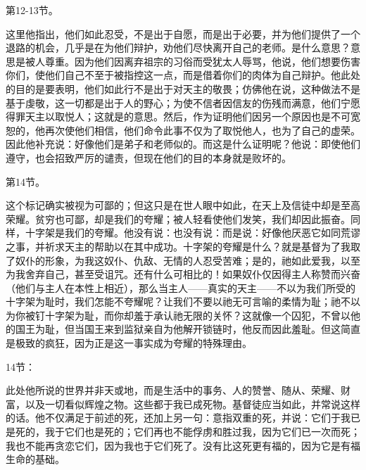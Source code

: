 第12-13节。\par

这里他指出，他们如此忍受，不是出于自愿，而是出于必要，并为他们提供了一个退路的机会，几乎是在为他们辩护，劝他们尽快离开自己的老师。是什么意思？意思是被人尊重。因为他们因离弃祖宗的习俗而受犹太人辱骂，他说，他们想要伤害你们，使他们自己不至于被指控这一点，而是借着你们的肉体为自己辩护。他此处的目的是要表明，他们如此行不是出于对天主的敬畏；仿佛他在说，这种做法不是基于虔敬，这一切都是出于人的野心；为使不信者因信友的伤残而满意，他们宁愿得罪天主以取悦人；这就是的意思。然后，作为证明他们因另一个原因也是不可宽恕的，他再次使他们相信，他们命令此事不仅为了取悦他人，也为了自己的虚荣。因此他补充说：好像他们是弟子和老师似的。而这是什么证明呢？他说：即使他们遵守，也会招致严厉的谴责，但现在他们的目的本身就是败坏的。\par

第14节。\par

这个标记确实被视为可鄙的；但这只是在世人眼中如此，在天上及信徒中却是至高荣耀。贫穷也可鄙，却是我们的夸耀；被人轻看使他们发笑，我们却因此振奋。同样，十字架是我们的夸耀。他没有说：也没有说：而是说：好像他厌恶它如同荒谬之事，并祈求天主的帮助以在其中成功。十字架的夸耀是什么？就是基督为了我取了奴仆的形象，为我这奴仆、仇敌、无情的人忍受苦难；是的，祂如此爱我，以至为我舍弃自己，甚至受诅咒。还有什么可相比的！如果奴仆仅因得主人称赞而兴奋（他们与主人在本性上相近），那么当主人——真实的天主——不以为我们所受的十字架为耻时，我们怎能不夸耀呢？让我们不要以祂无可言喻的柔情为耻；祂不以为你被钉十字架为耻，而你却羞于承认祂无限的关怀？这就像一个囚犯，不曾以他的国王为耻，但当国王来到监狱亲自为他解开锁链时，他反而因此羞耻。但这简直是极致的疯狂，因为正是这一事实成为夸耀的特殊理由。\par

14节：\par

此处他所说的世界并非天或地，而是生活中的事务、人的赞誉、随从、荣耀、财富，以及一切看似辉煌之物。这些都于我已成死物。基督徒应当如此，并常说这样的话。他不仅满足于前述的死，还加上另一句：意指双重的死，并说：它们于我已是死的，我于它们也是死的；它们再也不能俘虏和胜过我，因为它们已一次而死；我也不能再贪恋它们，因为我也于它们死了。没有比这死更有福的，因为它是有福生命的基础。\par

